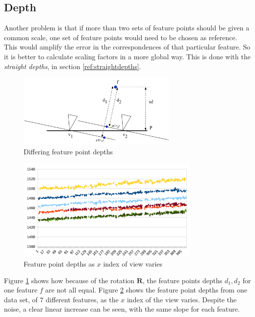 \documentclass{scrreprt}
\newcommand{\matr}[1]{\mathbf{#1}}
\begin{document}
\pagebreak
\subsection{Depth}
Another problem is that if more than two sets of feature points should be given a common scale, one set of feature points would need to be chosen as reference. This would amplify the error in the correspondences of that particular feature. So it is better to calculate scaling factors in a more global way. This is done with the \emph{straight depths}, in section \ref{ref:straightdepths}.

\begin{figure}[h]
\centering
\includegraphics[width=0.7\textwidth]{differentdepths.pdf}
\caption{Differing feature point depths}
\label{fig:differentdepths}
\end{figure}

\begin{figure}[h]
\centering
\includegraphics[width=0.8\textwidth]{xdepths.pdf}
\caption{Feature point depths as $x$ index of view varies}
\label{fig:xdepths}
\end{figure}

Figure \ref{fig:differentdepths} shows how because of the rotation $\matr{R}$, the feature points depths $d_1, d_2$ for one feature $f$ are not all equal. Figure \ref{fig:xdepths} shows the feature point depths from one data set, of $7$ different features, as the $x$ index of the view varies. Despite the noise, a clear linear increase can be seen, with the same slope for each feature.
\end{document}

